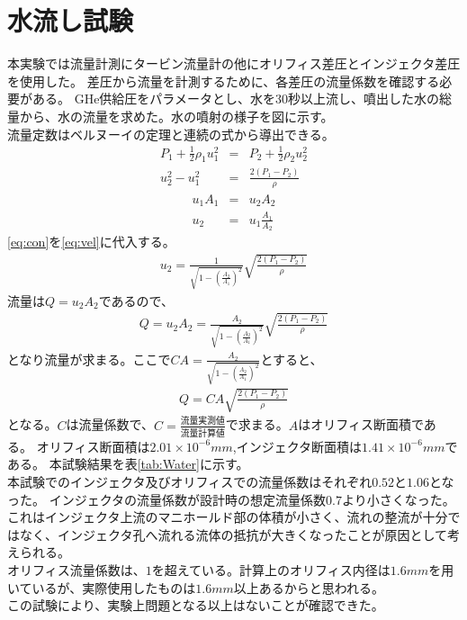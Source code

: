 \section{水流し試験}
本実験では流量計測にタービン流量計の他にオリフィス差圧とインジェクタ差圧を使用した。
差圧から流量を計測するために、各差圧の流量係数を確認する必要がある。
GHe供給圧をパラメータとし、水を30秒以上流し、噴出した水の総量から、水の流量を求めた。水の噴射の様子を図に示す。
\\
流量定数はベルヌーイの定理と連続の式から導出できる。
\begin{eqnarray}
P_{1} + \frac{1}{2} \rho_{1} u^2_{1} &=& P_{2} + \frac{1}{2} \rho_{2} u^2_{2}  \nonumber \\
u^2_{2} - u^2_{1} &=& \frac{2(P_{1}-P_{2})}{\rho} 
\label{eq:vel}
\end{eqnarray}
\begin{eqnarray}
u_{1}A_{1} &=& u_{2}A_{2}  \nonumber \\
u_{2} &=& u_{1}\frac{A_{1}}{A_{2}}
\label{eq:con}
\end{eqnarray}
\ref{eq:con}を\ref{eq:vel}に代入する。
\begin{eqnarray}
u_{2}=\frac{1}{\sqrt{1-(\frac{A_{2}}{A_{1}})^2}}\sqrt{\frac{2(P_{1}-P_{2})}{\rho}}
\label{eq:Velocity}
\end{eqnarray}
流量は$Q=u_{2}A_{2}$であるので、
\begin{eqnarray}
Q=u_{2}A_{2}=\frac{A_{2}}{\sqrt{1-(\frac{A_{2}}{A_{1}})^2}}\sqrt{\frac{2(P_{1}-P_{2})}{\rho}}
\label{eq:VFlux}
\end{eqnarray}
となり流量が求まる。ここで$CA=\frac{A_{2}}{\sqrt{1-(\frac{A_{2}}{A_{1}})^2}}$とすると、
\begin{eqnarray}
Q=CA\sqrt{\frac{2(P_{1}-P_{2})}{\rho}}
\label{eq:IdealFlux}
\end{eqnarray}
となる。$C$は流量係数で、$C=\frac{流量実測値}{流量計算値}$で求まる。$A$はオリフィス断面積である。
オリフィス断面積は$2.01 \times 10^{-6}mm$,インジェクタ断面積は$1.41 \times 10^{-6}mm$である。
本試験結果を表\ref{tab:Water}に示す。
\\
本試験でのインジェクタ及びオリフィスでの流量係数はそれぞれ$0.52$と$1.06$となった。
インジェクタの流量係数が設計時の想定流量係数$0.7$より小さくなった。
これはインジェクタ上流のマニホールド部の体積が小さく、流れの整流が十分ではなく、インジェクタ孔へ流れる流体の抵抗が大きくなったことが原因として考えられる。
\\
オリフィス流量係数は、$1$を超えている。計算上のオリフィス内径は$1.6mm$を用いているが、実際使用したものは$1.6mm$以上あるからと思われる。
\\
この試験により、実験上問題となる以上はないことが確認できた。

